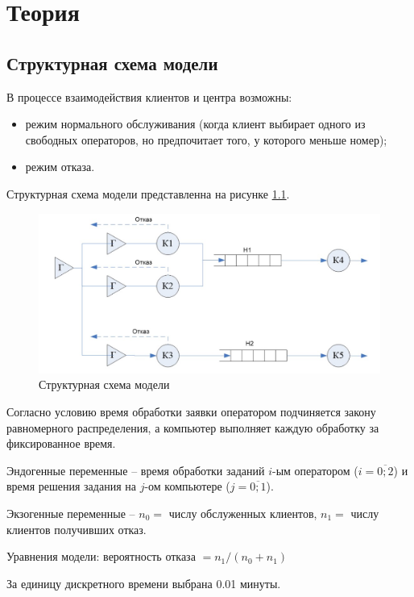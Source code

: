 \chapter{Теория}
\section{Структурная схема модели}

В процессе взаимодействия клиентов и центра возможны:
\begin{itemize}
	\item режим нормального обслуживания (когда клиент выбирает одного из свободных операторов, но предпочитает того, у которого меньше номер);
	\item режим отказа.
\end{itemize}

Структурная схема модели представленна на рисунке \ref{s2}.

\begin{figure}[h]
	\includegraphics[width=1\linewidth]{inc/img/schema2.jpg}
	\caption{Структурная схема модели}
	\label{s2}
\end{figure}

Согласно условию время обработки заявки оператором подчиняется закону равномерного распределения, а компьютер выполняет каждую обработку за фиксированное время.

Эндогенные переменные -- время обработки заданий $i$-ым оператором ($i = \overline{0;2}$) и время решения задания на $j$-ом компьютере ($j = \overline{0;1}$).

Экзогенные переменные -- $n_0 =$ числу обслуженных клиентов, $n_1 =$ числу клиентов получивших отказ.

Уравнения модели: вероятность отказа $= n_1/(n_0+n_1)$

За единицу дискретного времени выбрана 0.01 минуты.
